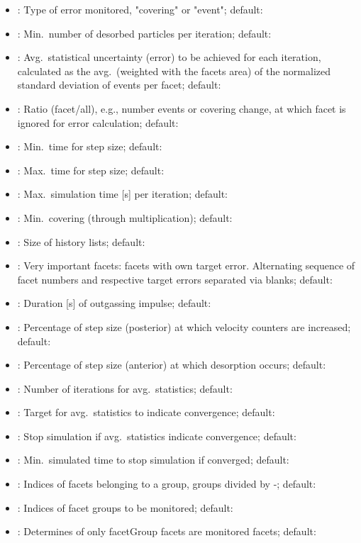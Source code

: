 \begin{itemize}[noitemsep,topsep=0pt, partopsep=0pt]
\item {}: Type of error monitored, "covering" or "event"; default: 
\item {}: Min.\ number of desorbed particles per iteration; default: 
\item {}: Avg.\ statistical uncertainty (error) to be achieved for each iteration, calculated as the avg.\ (weighted with the facets area) of the normalized standard deviation of events per facet; default: 
\item {}: Ratio (facet/all), e.g., number events or covering change, at which facet is ignored for error calculation; default: 
\item {}: Min.\ time for step size; default:
\item {}: Max.\ time for step size; default:
\item {}: Max.\ simulation time [s] per iteration; default:
\item {}: Min.\ covering (through multiplication); default:
\item {}: Size of history lists; default:
\item {}: Very important facets: facets with own target error. Alternating sequence of facet numbers and respective target errors separated via blanks; default:\codew{[]}
\item {}: Duration [s] of outgassing impulse; default: 
\item {}: Percentage of step size (posterior) at which velocity counters are increased; default: 
\item {}: Percentage of step size (anterior) at which desorption occurs; default: 
\item {}: Number of iterations for avg.\ statistics; default: 
\item {}: Target for avg.\ statistics to indicate convergence; default: 
\item {}: Stop simulation if avg.\ statistics indicate convergence; default: 
\item {}: Min.\ simulated time to stop simulation if converged; default: 
\item {}:  Indices of facets belonging to a group, groups divided by -; default:\codew{[]}
\item {}: Indices of facet groups to be monitored; default:\codew{[]}
\item {}: Determines of only facetGroup facets are monitored facets; default:
\end{itemize}
